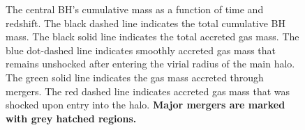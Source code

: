 \documentclass[]{emulateapj}
\begin{document}


\begin{figure}
\centerline{}
\caption[]{The central BH's cumulative mass as a function of time and redshift. The black dashed line indicates the total cumulative BH mass. The black solid line indicates the total accreted gas mass. The blue dot-dashed line indicates smoothly accreted gas mass that remains unshocked after entering the virial radius of the main halo. The green solid line indicates the gas mass accreted through mergers. The red dashed line indicates accreted gas mass that was shocked upon entry into the halo. \textbf{Major mergers are marked with grey hatched regions.}}
\label{hrh258allmassgas} 
\end{figure}
\end{document}
